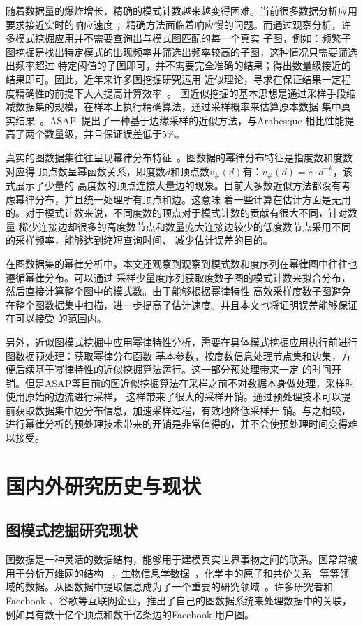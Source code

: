 \documentclass[master]{thesis-uestc}
\begin{document}
    随着数据量的爆炸增长，精确的模式计数越来越变得困难。当前很多数据分析应用要求接近实时的响应速度
，精确方法面临着响应慢的问题。而通过观察分析，许多模式挖掘应用并不需要查询出与模式图匹配的每一个真实
子图，例如：频繁子图挖掘是找出特定模式的出现频率并筛选出频率较高的子图，这种情况只需要筛选出频率超过
特定阈值的子图即可，并不需要完全准确的结果；得出数量级接近的结果即可。因此，近年来许多图挖掘研究运用
近似理论，寻求在保证结果一定程度精确性的前提下大大提高计算效率~\cite{BlinkDB,GRASS}。
图近似挖掘的基本思想是通过采样手段缩减数据集的规模，在样本上执行精确算法，通过采样概率来估算原本数据
集中真实结果~\cite{Congressional}。ASAP~\cite{ASAP}提出了一种基于边缘采样的近似方法，与Arabesque
相比性能提高了两个数量级，并且保证误差低于5\%。

    真实的图数据集往往呈现幂律分布特征~\cite{LargeScale}。图数据的幂律分布特征是指度数和度数对应得
顶点数呈幂函数关系，即度数$d$和顶点数$v_{\#}(d)$有：$v_{\#}(d)=c \cdot d^{-k}$，该式展示了少量的
高度数的顶点连接大量边的现象。目前大多数近似方法都没有考虑幂律分布，并且统一处理所有顶点和边。这意味
着一些计算在估计方面是无用的。对于模式计数来说，不同度数的顶点对于模式计数的贡献有很大不同，针对数量
稀少连接边却很多的高度数节点和数量庞大连接边较少的低度数节点采用不同的采样频率，能够达到缩短查询时间、
减少估计误差的目的。

    在图数据集的幂律分析中，本文还观察到观察到模式数和度序列在幂律图中往往也遵循幂律分布。可以通过
采样少量度序列获取度数子图的模式计数来拟合分布，然后直接计算整个图中的模式数。由于能够根据幂律特性
高效采样度数子图避免在整个图数据集中扫描，进一步提高了估计速度。并且本文也将证明误差能够保证在可以接受
的范围内。

    另外，近似图模式挖掘中应用幂律特性分析，需要在具体模式挖掘应用执行前进行图数据预处理：获取幂律分布函数
基本参数，按度数信息处理节点集和边集，方便后续基于幂律特性的近似挖掘算法运行。这一部分预处理带来一定
的时间开销。但是ASAP等目前的图近似挖掘算法在采样之前不对数据本身做处理，采样时使用原始的边流进行采样，
这样带来了很大的采样开销。通过预处理技术可以提前获取数据集中边分布信息，加速采样过程，有效地降低采样开
销。与之相较，进行幂律分析的预处理技术带来的开销是非常值得的，并不会使预处理时间变得难以接受。


\section{国内外研究历史与现状}
\subsection{图模式挖掘研究现状}
    图数据是一种灵活的数据结构，能够用于建模真实世界事物之间的联系。图常常被用于分析万维网的结构
~\cite{WebgraphFramework}，生物信息学数据~\cite{DeNovo}，化学中的原子和共价关系~\cite{Chemistry}
等等领域的数据。从图数据中提取信息成为了一个重要的研究领域~\cite{NetworkScience}。许多研究者和Facebook
、谷歌等互联网企业，推出了自己的图数据系统来处理数据中的关联，例如具有数十亿个顶点和数千亿条边的Facebook
用户图。
\end{document}
